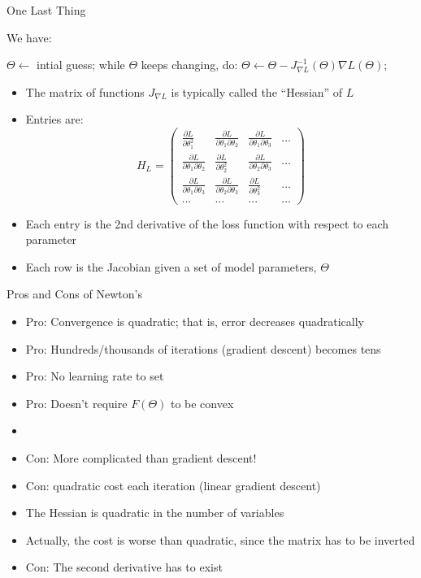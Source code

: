 \documentclass[aspectratio=169]{beamer}
\begin{document}
\begin{frame}[fragile]{One Last Thing}

We have:

\begin{SQL}
$\Theta \leftarrow$ intial guess;
while $\Theta$ keeps changing, do:
  $\Theta \leftarrow \Theta - J_{\nabla L}^{-1}(\Theta)\nabla L(\Theta)$;
\end{SQL}

\begin{itemize}
\item The matrix of functions $J_{\nabla L}$ is typically called the ``Hessian'' of $L$
\item Entries are:
	$$ H_L = \left( \begin{array}{cccc}
	\frac{\partial L}{\partial \theta_1^2} & \frac{\partial L}{\partial \theta_1 \partial \theta_2} & \frac{\partial L}{\partial \theta_1 \partial \theta_3} & ... \\
	\frac{\partial L}{\partial \theta_1 \partial \theta_2} & \frac{\partial L}{\partial \theta_2^2} & \frac{\partial L}{\partial \theta_2 \partial \theta_3} & ... \\
	\frac{\partial L}{\partial \theta_1 \partial \theta_3} & \frac{\partial L}{\partial \theta_2 \partial \theta_3} & \frac{\partial L}{\partial \theta_3^2} & ... \\
	... & ... & ... & ... 
	 \end{array} \right)$$
\item Each entry is the 2nd derivative of the loss function with respect to each parameter
\item Each row is the Jacobian given a set of model parameters, $\Theta$
\end{itemize}
\end{frame}
\begin{frame}{Pros and Cons of Newton's}

\begin{itemize}
\item Pro: Convergence is quadratic; that is, error decreases quadratically
\item Pro: Hundreds/thousands of iterations (gradient descent) becomes tens
\item Pro: No learning rate to set
\item Pro: Doesn't require $F(\Theta)$ to be convex
\item[]
\item Con: More complicated than gradient descent!
\item Con: quadratic cost each iteration (linear gradient descent)
\item[] The Hessian is quadratic in the number of variables
\item Actually, the cost is worse than quadratic, since the matrix has to be inverted 
\item Con: The second derivative has to exist
\end{itemize}
\end{frame}
\end{document}
